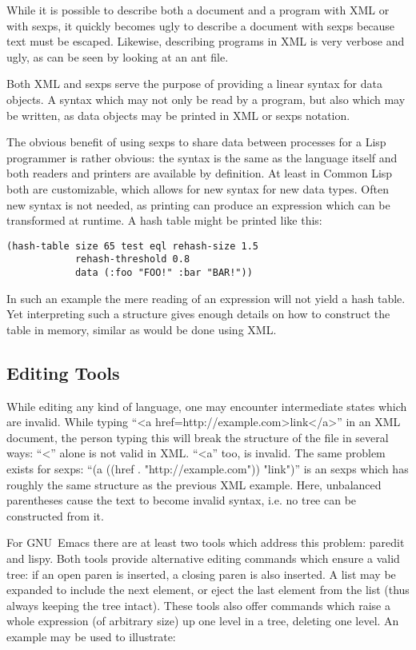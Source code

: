 \documentclass[a4paper,10pt,twoside]{article}
\newcommand{\cl}{Common Lisp}
\newcommand{\emacs}{GNU~Emacs}
\begin{document}
While it is possible to describe both a document and a program with XML or with
sexps, it quickly becomes ugly to describe a document with sexps because text
must be escaped.  Likewise, describing programs in XML is very verbose and ugly,
as can be seen by looking at an ant file.

Both XML and sexps serve the purpose of providing a linear syntax for data
objects.  A syntax which may not only be read by a program, but also which may
be written, as data objects may be printed in XML or sexps notation.

The obvious benefit of using sexps to share data between processes for a Lisp
programmer is rather obvious: the syntax is the same as the language itself and
both readers and printers are available by definition.  At least in \cl{} both
are customizable, which allows for new syntax for new data types.  Often new
syntax is not needed, as printing can produce an expression which can be
transformed at runtime.  A hash table might be printed like this:
\begin{lstlisting}[style=lispinline]
(hash-table size 65 test eql rehash-size 1.5
            rehash-threshold 0.8
            data (:foo "FOO!" :bar "BAR!"))
\end{lstlisting}

In such an example the mere reading of an expression will not yield a hash
table.  Yet interpreting such a structure gives enough details on how to
construct the table in memory, similar as would be done using XML.

\subsection{Editing Tools}
\label{subsec:edit-tools}

While editing any kind of language, one may encounter intermediate states which
are invalid.  While typing ``<a href=http://example.com>link</a>'' in an XML
document, the person typing this will break the structure of the file in several
ways:  ``<'' alone is not valid in XML.  ``<a'' too, is invalid.  The same
problem exists for sexps: ``(a ((href . "http://example.com")) "link")'' is an
sexps which has roughly the same structure as the previous XML example.  Here,
unbalanced parentheses cause the text to become invalid syntax, i.e. no tree can
be constructed from it.

For \emacs{} there are at least two tools which address this problem:
paredit\cite{paredit} and lispy\cite{lispy}.  Both tools provide alternative
editing commands which ensure a valid tree:  if an open paren is inserted, a
closing paren is also inserted.  A list may be expanded to include the next
element, or eject the last element from the list (thus always keeping the tree
intact).  These tools also offer commands which raise a whole expression (of
arbitrary size) up one level in a tree, deleting one level.  An example may be
used to illustrate:
\end{document}
